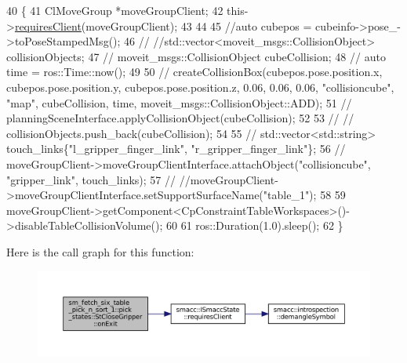 \begin{DoxyCode}
40          \{
41             ClMoveGroup *moveGroupClient;
42             this->\hyperlink{classsmacc_1_1ISmaccState_a7f95c9f0a6ea2d6f18d1aec0519de4ac}{requiresClient}(moveGroupClient);
43 
44 
45             \textcolor{comment}{//auto cubepos = cubeinfo->pose\_->toPoseStampedMsg();}
46             \textcolor{comment}{// //std::vector<moveit\_msgs::CollisionObject> collisionObjects;}
47             \textcolor{comment}{// moveit\_msgs::CollisionObject cubeCollision;}
48             \textcolor{comment}{// auto time = ros::Time::now();}
49 
50             \textcolor{comment}{// createCollisionBox(cubepos.pose.position.x, cubepos.pose.position.y,
       cubepos.pose.position.z, 0.06, 0.06, 0.06, "collisioncube", "map",  cubeCollision, time, moveit\_msgs::CollisionObject::ADD);}
51             \textcolor{comment}{// planningSceneInterface.applyCollisionObject(cubeCollision);}
52 
53             \textcolor{comment}{// // collisionObjects.push\_back(cubeCollision);}
54             
55             \textcolor{comment}{// std::vector<std::string> touch\_links\{"l\_gripper\_finger\_link", "r\_gripper\_finger\_link"\};}
56             \textcolor{comment}{// moveGroupClient->moveGroupClientInterface.attachObject("collisioncube", "gripper\_link",
       touch\_links);}
57             \textcolor{comment}{// //moveGroupClient->moveGroupClientInterface.setSupportSurfaceName("table\_1");}
58             
59             moveGroupClient->getComponent<CpConstraintTableWorkspaces>()->disableTableCollisionVolume();
60 
61             ros::Duration(1.0).sleep();
62          \}
\end{DoxyCode}
Here is the call graph for this function\+:
\nopagebreak
\begin{figure}[H]
\begin{center}
\leavevmode
\includegraphics[width=350pt]{structsm__fetch__six__table__pick__n__sort__1_1_1pick__states_1_1StCloseGripper_a170a2f8e9da53e351b43412fd19c436d_cgraph}
\end{center}
\end{figure}
\mbox{\label{structsm__fetch__six__table__pick__n__sort__1_1_1pick__states_1_1StCloseGripper_ada992443b10f8414a0b0c58ddde4ab62}} 
